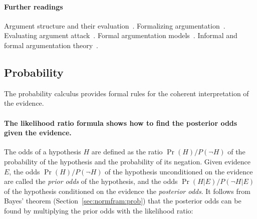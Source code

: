 \documentclass[10pt]{article}
\begin{document}
\paragraph{Further readings}
Argument structure and their evaluation~\citep{pollock1995}. Formalizing argumentation~\citep{prakkenVreeswijk2002}. Evaluating argument attack~\citep{dung1995}. 
Formal argumentation models~\citep{simariLoui1992, vreeswijk1997, prakken2010, verheij2003deflog, gordonEtal2007}. Informal and formal argumentation theory~\citep{vanEemerenEtal2014}.





\subsection{Probability}

The probability calculus provides formal rules for the coherent interpretation of the evidence.


\paragraph{The likelihood ratio formula shows how to find the posterior odds given the evidence.} 
The odds of a hypothesis $H$ are defined as the ratio $\Pr(H)/P(\neg H)$ of the probability of the hypothesis and the probability of its negation. Given evidence $E$, the odds $\Pr(H)/P(\neg H)$ 
of the hypothesis unconditioned on the evidence are called the \emph{prior odds} of the hypothesis, and the odds $\Pr(H | E)/P(\neg H | E)$ of the hypothesis 
conditioned on the evidence the \emph{posterior odds}.
It follows from Bayes' theorem (Section~\ref{sec:normfram:prob}) that the posterior odds can 
be found by multiplying the prior odds with the likelihood ratio: 
\end{document}
